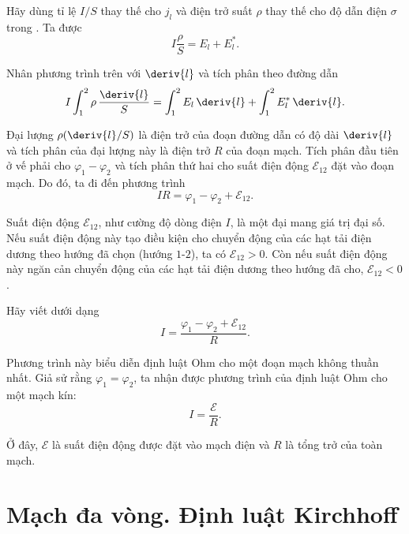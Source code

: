 Hãy dùng tỉ lệ $I/S$ thay thế cho $j_l$ và điện trở suất $\rho$ thay thế cho độ dẫn điện $\sigma$ trong . Ta được
\begin{equation*}
    I \frac{\rho}{S} = E_l + E_l^*.
\end{equation*}

\noindent
Nhân phương trình trên với $\deriv{l}$ và tích phân theo đường dẫn
\begin{equation*}
    I \int_1^2 \rho\, \frac{\deriv{l}}{S} = \int_1^2 E_l\, \deriv{l} + \int_1^2 E_l^*\, \deriv{l}.
\end{equation*}

\noindent
Đại lượng $\rho(\deriv{l}/S)$ là điện trở của đoạn đường dẫn có độ dài $\deriv{l}$ và tích phân của đại lượng này là điện trở $R$ của đoạn mạch. Tích phân đầu tiên ở vế phải cho $\varphi_1-\varphi_2$ và tích phân thứ hai cho suất điện động $\mathcal{E}_{12}$ đặt vào đoạn mạch. Do đó, ta đi đến phương trình
\begin{equation}\label{eq:5_27}
    I R = \varphi_1 - \varphi_2 + \mathcal{E}_{12}.
\end{equation}

Suất điện động $\mathcal{E}_{12}$, như cường độ dòng điện $I$, là một đại mang giá trị đại số. Nếu suất điện động này tạo điều kiện cho chuyển động của các hạt tải điện dương theo hướng đã chọn (hướng $1$-$2$), ta có $\mathcal{E}_{12}>0$. Còn nếu suất điện động này ngăn cản chuyển động của các hạt tải điện dương theo hướng đã cho, $\mathcal{E}_{12}<0$.

Hãy viết  dưới dạng
\begin{equation}\label{eq:5_28}
    I= \frac{\varphi_1 - \varphi_2 + \mathcal{E}_{12}}{R}.
\end{equation}

\noindent
Phương trình này biểu diễn định luật Ohm cho một đoạn mạch không thuần nhất. Giả sử rằng $\varphi_1=\varphi_2$, ta nhận được phương trình của định luật Ohm cho một mạch kín:
\begin{equation}\label{eq:5_29}
    I= \frac{\mathcal{E}}{R}.
\end{equation}

\noindent
Ở đây, $\mathcal{E}$ là suất điện động được đặt vào mạch điện và $R$ là tổng trở của toàn mạch.

\section{Mạch đa vòng. Định luật Kirchhoff}\label{sec:5_6}

